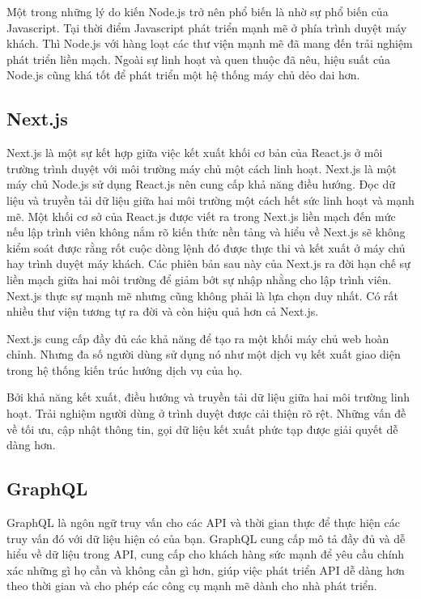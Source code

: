 \documentclass[11pt]{report}
\begin{document}
	Một trong những lý do kiến Node.js trở nên phổ biến là nhờ sự phổ biến của Javascript. Tại thời điểm Javascript phát triển mạnh mẽ ở phía trình duyệt máy khách. Thì Node.js với hàng loạt các thư viện mạnh mẽ đã mang đến trải nghiệm phát triển liền mạch. Ngoài sự linh hoạt và quen thuộc đã nêu, hiệu suất của Node.js cũng khá tốt để phát triển một hệ thống máy chủ dẻo dai hơn.
	
	\subsection{Next.js}
	
	Next.js là một sự kết hợp giữa việc kết xuất khối cơ bản của React.js ở môi trường trình duyệt với môi trường máy chủ một cách linh hoạt.
	Next.js là một máy chủ Node.js sử dụng React.js nên cung cấp khả năng điều hướng. Đọc dữ liệu và truyền tải dữ liệu giữa hai môi trường một cách hết sức linh hoạt và mạnh mẽ.
	Một khối cơ sở của React.js được viết ra trong Next.js liền mạch đến mức nếu lập trình viên không nắm rõ kiến thức nền tảng và hiểu về Next.js sẽ không kiểm soát được rằng rốt cuộc dòng lệnh đó được thực thi và kết xuất ở máy chủ hay trình duyệt máy khách.
	Các phiên bản sau này của Next.js ra đời hạn chế sự liền mạch giữa hai môi trường để giảm bớt sự nhập nhằng cho lập trình viên.
	Next.js thực sự mạnh mẽ nhưng cũng không phải là lựa chọn duy nhất. Có rất nhiều thư viện tương tự ra đời và còn hiệu quả hơn cả Next.js.
	
	Next.js cung cấp đầy đủ các khả năng để tạo ra một khối máy chủ web hoàn chỉnh. Nhưng đa số người dùng sử dụng nó như một dịch vụ kết xuất giao diện trong hệ thống kiến trúc hướng dịch vụ của họ.
	
	Bởi khả năng kết xuất, điều hướng và truyền tải dữ liệu giữa hai môi trường linh hoạt. Trải nghiệm người dùng ở trình duyệt được cải thiện rõ rệt. Những vấn đề về tối ưu, cập nhật thông tin, gọi dữ liệu kết xuất phức tạp được giải quyết dễ dàng hơn.
	
	\subsection{GraphQL}
	
	GraphQL là ngôn ngữ truy vấn cho các API và thời gian thực để thực hiện các truy vấn đó với dữ liệu hiện có của bạn. GraphQL cung cấp mô tả đầy đủ và dễ hiểu về dữ liệu trong API, cung cấp cho khách hàng sức mạnh để yêu cầu chính xác những gì họ cần và không cần gì hơn, giúp việc phát triển API dễ dàng hơn theo thời gian và cho phép các công cụ mạnh mẽ dành cho nhà phát triển.
	
\end{document}
